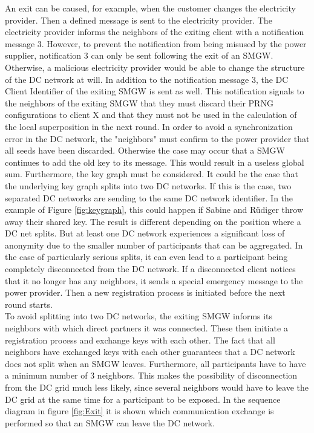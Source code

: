 An exit can be caused, for example, when the customer changes the electricity provider. Then a defined message is sent to the electricity provider. The electricity provider informs the neighbors of the exiting client with a notification message 3. However, to prevent the notification from being misused by the power supplier, notification 3 can only be sent following the exit of an SMGW. Otherwise, a malicious electricity provider would be able to change the structure of the DC network at will. In addition to the notification message 3, the DC Client Identifier of the exiting SMGW is sent as well. This notification signals to the neighbors of the exiting SMGW that they must discard their PRNG configurations to client X and that they must not be used in the calculation of the local superposition in the next round. In order to avoid a synchronization error in the DC network, the "neighbors" must confirm to the power provider that all seeds have been discarded. Otherwise the case may occur that a SMGW continues to add the old key to its message. This would result in a useless global sum. Furthermore, the key graph must be considered. It could be the case that the underlying key graph splits into two DC networks. If this is the case, two separated DC networks are sending to the same DC network identifier. In the example of Figure \ref{fig:keygraph}, this could happen if Sabine and Rüdiger throw away their shared key. The result is different depending on the position where a DC net splits. But at least one DC network experiences a significant loss of anonymity due to the smaller number of participants that can be aggregated. In the case of particularly serious splits, it can even lead to a participant being completely disconnected from the DC network. If a disconnected client notices that it no longer has any neighbors, it sends a special emergency message to the power provider. Then a new registration process is initiated before the next round starts.\\ To avoid splitting into two DC networks, the exiting SMGW informs its neighbors with which direct partners it was connected. These then initiate a registration process and exchange keys with each other. The fact that all neighbors have exchanged keys with each other guarantees that a DC network does not split when an SMGW leaves. Furthermore, all participants have to have a minimum number of 3 neighbors. This makes the possibility of disconnection from the DC grid much less likely, since several neighbors would have to leave the DC grid at the same time for a participant to be exposed. In the sequence diagram in figure \ref{fig:Exit} it is shown which communication exchange is performed so that an SMGW can leave the DC network.\\
